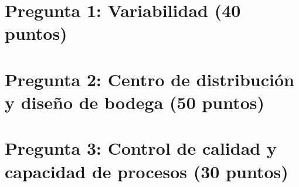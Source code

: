 \documentclass[12pt,a4paper]{article}
\begin{document}
\newpage


\section*{Pregunta 1: Variabilidad (40 puntos)}
\setcounter{section}{1}\setcounter{subsection}{0}



\newpage
\section*{Pregunta 2: Centro de distribución y diseño de bodega (50 puntos)}
\setcounter{section}{2}\setcounter{subsection}{0}



\newpage
\section*{Pregunta 3: Control de calidad y capacidad de procesos (30 puntos)}
\setcounter{section}{3}\setcounter{subsection}{0}


\end{document}
